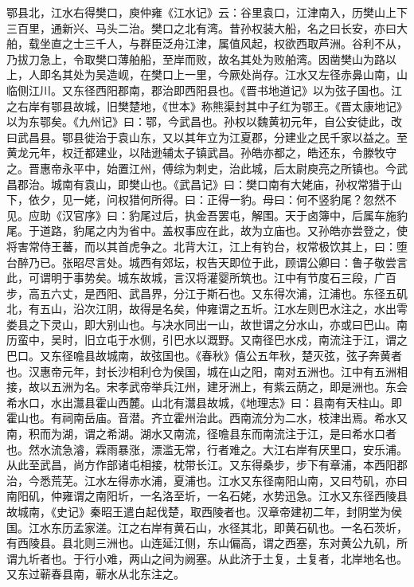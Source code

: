 \documentclass[12pt,UTF8]{ctexbook}
\begin{document}
鄂县北，江水右得樊口，庾仲雍《江水记》云：谷里袁口，江津南入，历樊山上下三百里，通新兴、马头二治。樊口之北有湾。昔孙权装大船，名之曰长安，亦曰大舶，载坐直之士三千人，与群臣泛舟江津，属值风起，权欲西取芦洲。谷利不从，乃拔刀急上，令取樊口薄舶船，至岸而败，故名其处为败舶湾。因凿樊山为路以上，人即名其处为吴造岘，在樊口上一里，今厥处尚存。江水又左径赤鼻山南，山临侧江川。又东径西阳郡南，郡治即西阳县也。《晋书地道记》以为弦子国也。江之右岸有鄂县故城，旧樊楚地，《世本》称熊渠封其中子红为鄂王。《晋太康地记》以为东鄂矣。《九州记》曰：鄂，今武昌也。孙权以魏黄初元年，自公安徒此，改曰武昌县。鄂县徙治于袁山东，又以其年立为江夏郡，分建业之民千家以益之。至黄龙元年，权迁都建业，以陆逊辅太子镇武昌。孙皓亦都之，皓还东，令滕牧守之。晋惠帝永平中，始置江州，傅综为刺史，治此城，后太尉庾亮之所镇也。今武昌郡治。城南有袁山，即樊山也。《武昌记》曰：樊口南有大姥庙，孙权常猎于山下，依夕，见一姥，问权猎何所得。曰：正得一豹。母曰：何不竖豹尾？忽然不见。应助《汉官序》曰：豹尾过后，执金吾罢屯，解围。天于卤簿中，后属车施豹尾。于道路，豹尾之内为省中。盖权事应在此，故为立庙也。又孙皓亦尝登之，使将害常侍王蕃，而以其首虎争之。北背大江，江上有钓台，权常极饮其上，曰：堕台醉乃已。张昭尽言处。城西有郊坛，权告天即位于此，顾谓公卿曰：鲁子敬尝言此，可谓明于事势矣。城东故城，言汉将灌婴所筑也。江中有节度石三段，广百步，高五六丈，是西阳、武昌界，分江于斯石也。又东得次浦，江浦也。东径五矶北，有五山，沿次江阴，故得是名矣，仲雍谓之五圻。江水左则巴水注之，水出雩娄县之下灵山，即大别山也。与决水同出一山，故世谓之分水山，亦或曰巴山。南历蛮中，吴时，旧立屯于水侧，引巴水以溉野。又南径巴水戍，南流注于江，谓之巴口。又东径噡县故城南，故弦国也。《春秋》僖公五年秋，楚灭弦，弦子奔黄者也。汉惠帝元年，封长沙相利仓为侯国，城在山之阳，南对五洲也。江中有五洲相接，故以五洲为名。宋孝武帝举兵江州，建牙洲上，有紫云荫之，即是洲也。东会希水口，水出灊县霍山西麓。山北有灊县故城，《地理志》曰：县南有天柱山。即霍山也。有祠南岳庙。音潜。齐立霍州治此。西南流分为二水，枝津出焉。希水又南，积而为湖，谓之希湖。湖水又南流，径噡县东而南流注于江，是曰希水口者也。然水流急濬，霖雨暴涨，漂滥无常，行者难之。大江右岸有厌里口，安乐浦。从此至武昌，尚方作部诸屯相接，枕带长江。又东得桑步，步下有章浦，本西阳郡治，今悉荒芜。江水左得赤水浦，夏浦也。江水又东径南阳山南，又曰芍矶，亦曰南阳矶，仲雍谓之南阳圻，一名洛至圻，一名石姥，水势迅急。江水又东径西陵县故城南，《史记》秦昭王遣白起伐楚，取西陵者也。汉章帝建初二年，封阴堂为侯国。江水东历孟家溠。江之右岸有黄石山，水径其北，即黄石矶也。一名石茨圻，有西陵县。县北则三洲也。山连延江侧，东山偏高，谓之西塞，东对黄公九矶，所谓九圻者也。于行小难，两山之间为阙塞。从此济于土复，土复者，北岸地名也。
又东过蕲春县南，蕲水从北东注之。
\end{document}

